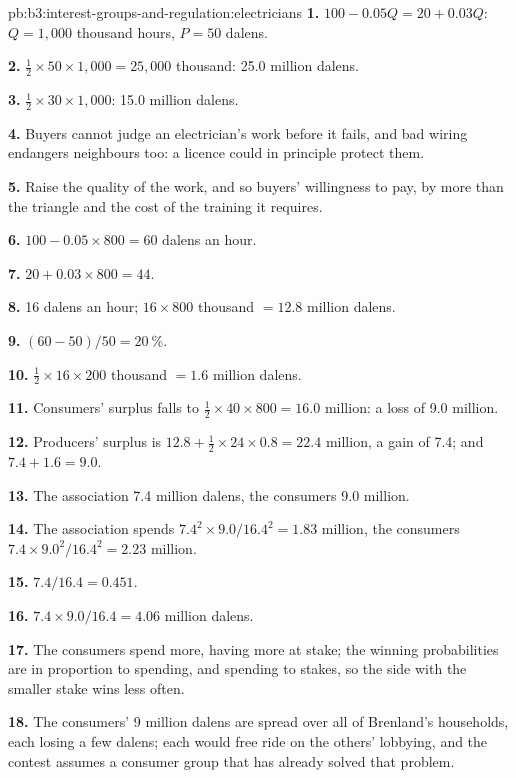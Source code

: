 \begin{solution}{pb:b3:interest-groups-and-regulation:electricians}
\textbf{1.} $100 - 0.05Q = 20 + 0.03Q$: $Q = 1{,}000$ thousand hours, $P = 50$ dalens.

\textbf{2.} $\tfrac12 \times 50 \times 1{,}000 = 25{,}000$ thousand: 25.0 million dalens.

\textbf{3.} $\tfrac12 \times 30 \times 1{,}000$: 15.0 million dalens.

\textbf{4.} Buyers cannot judge an electrician's work before it fails, and bad wiring
endangers neighbours too: a licence could in principle protect them.

\textbf{5.} Raise the quality of the work, and so buyers' willingness to pay, by more
than the triangle and the cost of the training it requires.

\textbf{6.} $100 - 0.05 \times 800 = 60$ dalens an hour.

\textbf{7.} $20 + 0.03 \times 800 = 44$.

\textbf{8.} 16 dalens an hour; $16 \times 800$ thousand $= 12.8$ million dalens.

\textbf{9.} $(60 - 50)/50 = 20~\%$.

\textbf{10.} $\tfrac12 \times 16 \times 200$ thousand $= 1.6$ million dalens.

\textbf{11.} Consumers' surplus falls to $\tfrac12 \times 40 \times 800 = 16.0$ million: a loss of 9.0 million.

\textbf{12.} Producers' surplus is $12.8 + \tfrac12 \times 24 \times 0.8 = 22.4$ million, a gain of 7.4; and $7.4 + 1.6 = 9.0$.

\textbf{13.} The association 7.4 million dalens, the consumers 9.0 million.

\textbf{14.} The association spends $7.4^2 \times 9.0/16.4^2 = 1.83$ million, the consumers $7.4 \times 9.0^2/16.4^2 = 2.23$ million.

\textbf{15.} $7.4/16.4 = 0.451$.

\textbf{16.} $7.4 \times 9.0/16.4 = 4.06$ million dalens.

\textbf{17.} The consumers spend more, having more at stake; the winning probabilities
are in proportion to spending, and spending to stakes, so the side with the smaller
stake wins less often.

\textbf{18.} The consumers' 9 million dalens are spread over all of Brenland's
households, each losing a few dalens; each would free ride on the others'
lobbying, and the contest assumes a consumer group that has already solved that
problem.


\end{solution}
